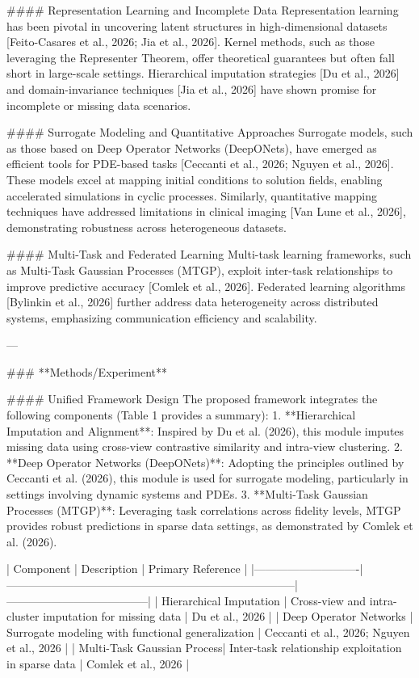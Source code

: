#### Representation Learning and Incomplete Data  
Representation learning has been pivotal in uncovering latent structures in high-dimensional datasets [Feito-Casares et al., 2026; Jia et al., 2026]. Kernel methods, such as those leveraging the Representer Theorem, offer theoretical guarantees but often fall short in large-scale settings. Hierarchical imputation strategies [Du et al., 2026] and domain-invariance techniques [Jia et al., 2026] have shown promise for incomplete or missing data scenarios.

#### Surrogate Modeling and Quantitative Approaches  
Surrogate models, such as those based on Deep Operator Networks (DeepONets), have emerged as efficient tools for PDE-based tasks [Ceccanti et al., 2026; Nguyen et al., 2026]. These models excel at mapping initial conditions to solution fields, enabling accelerated simulations in cyclic processes. Similarly, quantitative mapping techniques have addressed limitations in clinical imaging [Van Lune et al., 2026], demonstrating robustness across heterogeneous datasets.

#### Multi-Task and Federated Learning  
Multi-task learning frameworks, such as Multi-Task Gaussian Processes (MTGP), exploit inter-task relationships to improve predictive accuracy [Comlek et al., 2026]. Federated learning algorithms [Bylinkin et al., 2026] further address data heterogeneity across distributed systems, emphasizing communication efficiency and scalability.

---

### **Methods/Experiment**  

#### Unified Framework Design  
The proposed framework integrates the following components (Table 1 provides a summary):  
1. **Hierarchical Imputation and Alignment**: Inspired by Du et al. (2026), this module imputes missing data using cross-view contrastive similarity and intra-view clustering.  
2. **Deep Operator Networks (DeepONets)**: Adopting the principles outlined by Ceccanti et al. (2026), this module is used for surrogate modeling, particularly in settings involving dynamic systems and PDEs.  
3. **Multi-Task Gaussian Processes (MTGP)**: Leveraging task correlations across fidelity levels, MTGP provides robust predictions in sparse data settings, as demonstrated by Comlek et al. (2026).  

| Component                  | Description                                                                 | Primary Reference                    |
|----------------------------|-----------------------------------------------------------------------------|--------------------------------------|
| Hierarchical Imputation    | Cross-view and intra-cluster imputation for missing data                   | Du et al., 2026                      |
| Deep Operator Networks     | Surrogate modeling with functional generalization                         | Ceccanti et al., 2026; Nguyen et al., 2026 |
| Multi-Task Gaussian Process| Inter-task relationship exploitation in sparse data                       | Comlek et al., 2026                  |

